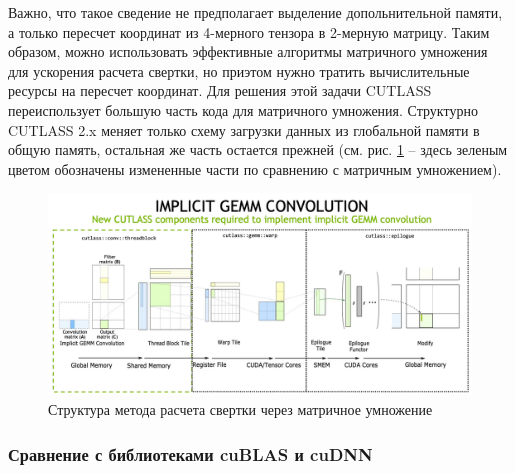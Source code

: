 Важно, что такое сведение не предполагает выделение допольнительной памяти, а только пересчет координат из 4-мерного тензора в 2-мерную матрицу.
Таким образом, можно использовать эффективные алгоритмы матричного умножения для ускорения расчета свертки, но приэтом нужно тратить вычислительные
ресурсы на пересчет координат. Для решения этой задачи CUTLASS переиспользует большую часть кода для матричного умножения.
Структурно CUTLASS 2.x меняет только схему загрузки данных из глобальной памяти в общую память, остальная же часть остается прежней
(см. рис. \ref{fig:implicit_gemm_struct} -- здесь зеленым цветом обозначены измененные части по сравнению с матричным умножением).
\begin{figure}
    \centering
    \includegraphics[scale=0.35]{src/images/implicit_gemm_struct.png}
    \caption{Структура метода расчета свертки через матричное умножение}
    \label{fig:implicit_gemm_struct}
\end{figure}

\subsubsection{Сравнение с библиотеками cuBLAS и cuDNN}
\label{subsec:comparison}

